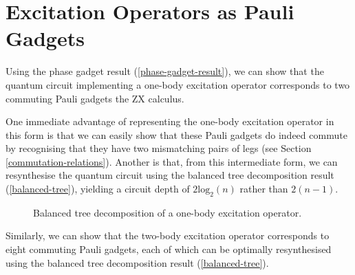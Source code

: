 \section{Excitation Operators as Pauli Gadgets}%
\label{excitation-operators-pauli-gadgets}

Using the phase gadget result (\ref{phase-gadget-result}), we can show that the quantum circuit implementing a one-body excitation operator corresponds to two commuting Pauli gadgets the ZX calculus.


One immediate advantage of representing the one-body excitation operator in this form is that we can easily show that these Pauli gadgets do indeed commute by recognising that they have two mismatching pairs of legs (see Section \ref{commutation-relations}). Another is that, from this intermediate form, we can resynthesise the quantum circuit using the balanced tree decomposition result (\ref{balanced-tree}), yielding a circuit depth of $2\text{log}_2(n)$ rather than $2(n-1)$.

\begin{figure}[H]
    \centering
    \caption{Balanced tree decomposition of a one-body excitation operator.}
\end{figure}

Similarly, we can show that the two-body excitation operator corresponds to eight commuting Pauli gadgets, each of which can be optimally resynthesised using the balanced tree decomposition result (\ref{balanced-tree}).

